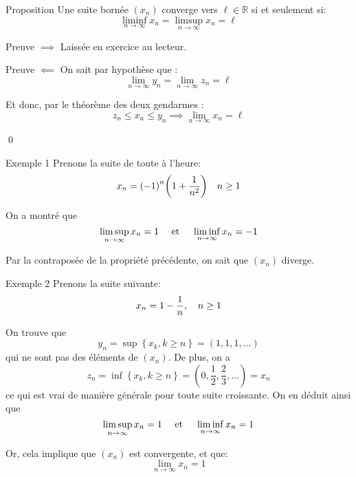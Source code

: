 \documentclass[a4paper]{article}
\begin{document}
\begin{parag}{Proposition}
    Une suite bornée $\left(x_n\right)$ converge vers $\ell \in \mathbb{R}$ si et seulement si: 
    \[\liminf_{n \to \infty} x_n = \limsup_{n \to \infty}x_n = \ell\]
    
    \begin{subparag}{Preuve $\implies$}
        Laissée en exercice au lecteur.
    \end{subparag}
    
    \begin{subparag}{Preuve $\impliedby$}
        On sait par hypothèse que :
        \[\lim_{n \to \infty} y_n = \lim_{n \to \infty} z_n = \ell\]

        Et donc, par le théorème des deux gendarmes :
        \[z_n \leq x_n \leq y_n \implies \lim_{n \to \infty} x_n = \ell\]
        
        \qed
    \end{subparag}
    
\end{parag}

\begin{parag}{Exemple 1}
    Prenons la suite de toute à l'heure: 
    \[x_n = \left(-1\right)^{n} \left(1 + \frac{1}{n^2}\right) \mathspace n \geq 1\]
    
    On a montré que 
    \[\limsup_{n \to \infty} x_n = 1 \quad \text{ et } \quad \liminf_{n \to \infty} x_n = -1\]
    
    Par la contraposée de la propriété précédente, on sait que $\left(x_n\right)$ diverge.
\end{parag}

\begin{parag}{Exemple 2}
    Prenons la suite suivante: 
    \[x_n = 1 - \frac{1}{n}, \quad n \geq 1\]
    
    On trouve que 
    \[y_n = \sup\left\{x_k, k \geq n\right\} = \left(1, 1, 1, \ldots\right)\]
    qui ne sont pas des éléments de $\left(x_n\right)$. De plus, on a 
    \[z_n = \inf\left\{x_k, k \geq n\right\} = \left(0, \frac{1}{2}, \frac{2}{3}, \ldots\right) = x_n\]
    ce qui est vrai de manière générale pour toute suite croissante. On en déduit ainsi que 
    \[\limsup_{n \to \infty} x_n = 1 \quad \text{ et } \quad \liminf_{n \to \infty} x_n = 1\]
    
    Or, cela implique que $\left(x_n\right)$ est convergente, et que:
    \[\lim_{n \to \infty} x_n = 1\]
    
\end{parag}
\end{document}

